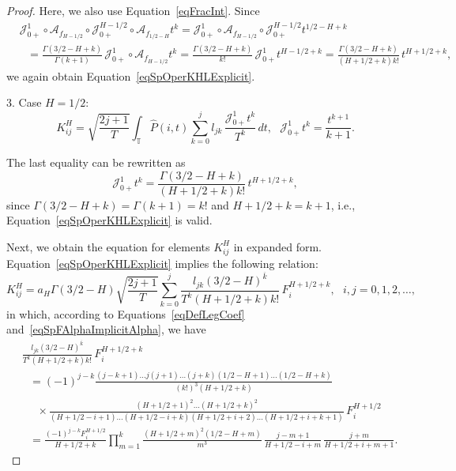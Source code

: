 \documentclass[10pt,reqno]{amsart}
\theoremstyle{plain}
\theoremstyle{remark}
\newcommand{\ca}{\mathcal{A}}
\newcommand{\cj}{\mathcal{J}}
\begin{document}
\begin{proof}
Here, we also use Equation~\eqref{eqFracInt}. Since
\begin{align*}
  & \cj_{0+}^1 \circ \ca_{f_{H-1/2}} \circ \cj_{0+}^{H-1/2} \circ \ca_{f_{1/2-H}} t^k = \cj_{0+}^1 \circ \ca_{f_{H-1/2}} \circ \cj_{0+}^{H-1/2} t^{1/2-H+k} \\
  & \ \ \ = \frac{\Gamma(3/2-H+k)}{\Gamma(k+1)} \, \cj_{0+}^1 \circ \ca_{f_{H-1/2}} t^k = \frac{\Gamma(3/2-H+k)}{k!} \, \cj_{0+}^1 t^{H-1/2+k} = \frac{\Gamma(3/2-H+k)}{(H+1/2+k) k!} \, t^{H+1/2+k},
\end{align*}
we again obtain Equation~\eqref{eqSpOperKHLExplicit}.

3. Case $H = 1/2$:
\[
  K_{ij}^H = \sqrt{\frac{2j+1}{T}} \int_\mathds{T} {\hat P(i,t) \sum\limits_{k=0}^j {l_{jk} \, \frac{\cj_{0+}^1 t^k}{T^k}} \, dt}, \ \ \ \cj_{0+}^1 t^k = \frac{t^{k+1}}{k+1}.
\]

The last equality can be rewritten as
\[
  \cj_{0+}^1 t^k = \frac{\Gamma(3/2-H+k)}{(H+1/2+k) k!} \, t^{H+1/2+k},
\]
since $\Gamma(3/2-H+k) = \Gamma(k+1) = k!$ and $H+1/2+k = k+1$, i.e., Equation~\eqref{eqSpOperKHLExplicit} is valid.

Next, we obtain the equation for elements $K_{ij}^H$ in expanded form. Equation~\eqref{eqSpOperKHLExplicit} implies the following relation:
\[
  K_{ij}^H = a_H \Gamma(3/2-H) \sqrt{\frac{2j+1}{T}} \sum\limits_{k=0}^j \frac{l_{jk} (3/2-H)^{\overline{k}}}{T^k (H+1/2+k) k!} \, F_i^{H+1/2+k}, \ \ \ i,j = 0,1,2,\dots,
\]
in which, according to Equations~\eqref{eqDefLegCoef} and~\eqref{eqSpFAlphaImplicitAlpha}, we have
\begin{align*}
  & \frac{l_{jk} (3/2-H)^{\overline{k}}}{T^k (H+1/2+k) k!} \, F_i^{H+1/2+k} \\
  & \ \ \ = (-1)^{j-k} \frac{(j-k+1) \ldots j(j+1) \ldots (j+k) (1/2-H+1) \ldots (1/2-H+k)}{(k!)^3 (H+1/2+k)} \\
  & \ \ \ \ \ \ {} \times \frac{(H+1/2+1)^2 \dots (H+1/2+k)^2}{(H+1/2-i+1) \dots (H+1/2-i+k) (H+1/2+i+2) \dots (H+1/2+i+k+1)} \, F_i^{H+1/2} \\
  & \ \ \ = \frac{(-1)^{j-k} F_i^{H+1/2}}{H+1/2+k} \prod\limits_{m=1}^k \frac{(H+1/2+m)^2 (1/2-H+m)}{m^3} \, \frac{j-m+1}{H+1/2-i+m} \, \frac{j+m}{H+1/2+i+m+1}.
\end{align*}


\end{proof}
\end{document}
